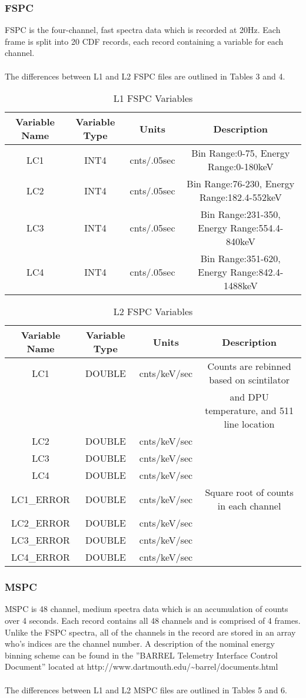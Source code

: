 \documentclass{article}
\begin{document}
\subsubsection{FSPC}
FSPC is the four-channel, fast spectra data which is recorded at 20Hz. Each frame is split into 20 CDF records, each record containing a variable for each channel.\\\\
The differences between L1 and L2 FSPC files are outlined in Tables 3 and 4.

\begin{table}[H]
\caption{L1 FSPC Variables}
\begin{tabular}{|c|c|c|c|}
\hline
Variable Name&Variable Type & Units & Description\\ \hline
LC1&INT4&cnts/.05sec&Bin Range:0-75, Energy Range:0-180keV\\
LC2&INT4&cnts/.05sec&Bin Range:76-230, Energy Range:182.4-552keV\\
LC3&INT4&cnts/.05sec&Bin Range:231-350, Energy Range:554.4-840keV\\
LC4&INT4&cnts/.05sec&Bin Range:351-620, Energy Range:842.4-1488keV\\
\hline
\end{tabular}
\end{table}

\begin{table}[H]
\caption{L2 FSPC Variables}
\begin{tabular}{|c|c|c|c|}
\hline
Variable Name&Variable Type&Units&Description\\ \hline
LC1&DOUBLE&cnts/keV/sec&Counts are rebinned based on scintilator\\
~&~&~&and DPU temperature, and 511 line location \\
LC2&DOUBLE&cnts/keV/sec &  ~\\ 
LC3&DOUBLE&cnts/keV/sec & ~\\ 
LC4&DOUBLE&cnts/keV/sec & ~\\
LC1\_ERROR&DOUBLE&cnts/keV/sec&Square root of counts in each channel\\ 
LC2\_ERROR&DOUBLE&cnts/keV/sec&~\\ 
LC3\_ERROR&DOUBLE&cnts/keV/sec&~\\ 
LC4\_ERROR&DOUBLE&cnts/keV/sec&~\\
\hline
\end{tabular}
\end{table}

\subsubsection{MSPC}
MSPC is 48 channel, medium spectra data which is an accumulation of counts over 4 seconds. Each record contains all 48 channels and is comprised of 4 frames. Unlike the FSPC spectra, all of the channels in the record are stored in an array who's indices are the channel number. A description of the nominal energy binning scheme can be found  in the ''BARREL Telemetry Interface Control Document'' located at http://www.dartmouth.edu/\~{}barrel/documents.html\\\\
The differences between L1 and L2 MSPC files are outlined in Tables 5 and 6.
\end{document}
